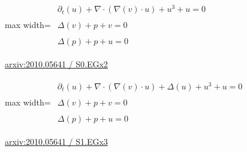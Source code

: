 \documentclass[10pt,a4paper]{article}
\begin{document}
\begin{minipage}{\linewidth}
\begin{center}\begin{adjustbox}{max width=\linewidth}$\displaystyle\begin{gathered}\begin{gathered}\partial_{t}(u)+\nabla\cdot(\nabla(v)\cdot u)+u^{3}+u=0\end{gathered}\\[5pt]\begin{gathered}\Delta(v)+p+v=0\end{gathered}\\[5pt]\begin{gathered}\Delta(p)+p+u=0\end{gathered}\end{gathered}$\end{adjustbox}\end{center}
{\small \href{https://arxiv.org/html/2010.05641#S0.EGx2}{arxiv:2010.05641 / S0.EGx2}}\par
\end{minipage}\par\vspace{7mm}

\begin{minipage}{\linewidth}
\begin{center}\begin{adjustbox}{max width=\linewidth}$\displaystyle\begin{gathered}\begin{gathered}\partial_{t}(u)+\nabla\cdot(\nabla(v)\cdot u)+\Delta(u)+u^{3}+u=0\end{gathered}\\[5pt]\begin{gathered}\Delta(v)+p+v=0\end{gathered}\\[5pt]\begin{gathered}\Delta(p)+p+u=0\end{gathered}\end{gathered}$\end{adjustbox}\end{center}
{\small \href{https://arxiv.org/html/2010.05641#S1.EGx3}{arxiv:2010.05641 / S1.EGx3}}\par
\end{minipage}\par\vspace{7mm}
\end{document}
